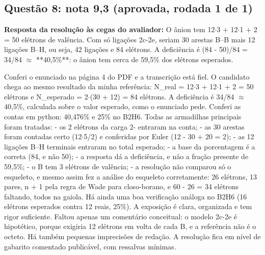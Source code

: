 \documentclass{article}%
\begin{document}
\subsection*{Questão 8: nota 9,3 (aprovada, rodada 1 de 1)}%
\textbf{Resposta da resolução às cegas do avaliador:} O ânion tem 12$\cdot$3 + 12$\cdot$1 + 2 = 50 elétrons de valência. Com só ligações 2c{-}2e, seriam 30 arestas B--B mais 12 ligações B--H, ou seja, 42 ligações e 84 elétrons. A deficiência é (84 - 50)/84 = 34/84 $\approx$ **40,5\%**: o ânion tem cerca de 59,5\% dos elétrons esperados.\par %
Conferi o enunciado na página 4 do PDF e a transcrição está fiel. O candidato chega ao mesmo resultado da minha referência: N\_real = 12$\cdot$3 + 12$\cdot$1 + 2 = 50 elétrons e N\_esperado = 2$\cdot$(30 + 12) = 84 elétrons. A deficiência é 34/84 $\approx$ 40,5\%, calculada sobre o valor esperado, como o enunciado pede. Conferi as contas em python: 40,476\% e 25\% no B2H6.\newline%
\newline%
Todas as armadilhas principais foram tratadas:\newline%
{-} os 2 elétrons da carga 2- entraram na conta;\newline%
{-} as 30 arestas foram contadas certo (12$\cdot$5/2) e conferidas por Euler (12 - 30 + 20 = 2);\newline%
{-} as 12 ligações B--H terminais entraram no total esperado;\newline%
{-} a base da porcentagem é a correta (84, e não 50);\newline%
{-} a resposta dá a deficiência, e não a fração presente de 59,5\%;\newline%
{-} o B tem 3 elétrons de valência;\newline%
{-} a resolução não comparou só o esqueleto, e mesmo assim fez a análise do esqueleto corretamente: 26 elétrons, 13 pares, n + 1 pela regra de Wade para closo{-}borano, e 60 - 26 = 34 elétrons faltando, todos na gaiola.\newline%
\newline%
Há ainda uma boa verificação análoga no B2H6 (16 elétrons esperados contra 12 reais, 25\%). A exposição é clara, organizada e tem rigor suficiente.\newline%
\newline%
Faltou apenas um comentário conceitual: o modelo 2c{-}2e é hipotético, porque exigiria 12 elétrons em volta de cada B, e a referência não é o octeto. Há também pequenas imprecisões de redação. A resolução fica em nível de gabarito comentado publicável, com ressalvas mínimas.%
\end{document}
